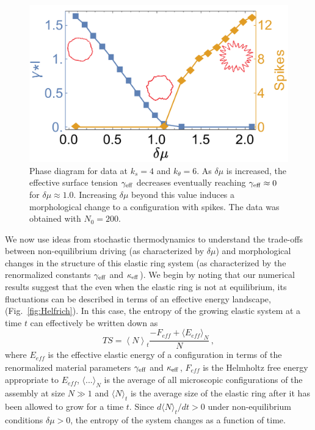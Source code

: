\documentclass[amsmath,preprintnumbers,10pt,nofootinbib,prl,twocolumn]{revtex4-1}
\begin{document}

\begin{figure}[tbb]
\centering
\includegraphics[scale=0.25]{lobefork4ktheta6new2Fig4.pdf}
\caption{Phase diagram for data at $k_s=4$ and $k_\theta = 6$. As $\delta\mu$ is increased, the effective surface tension $\gamma_{\rm eff}$ decreases eventually reaching $\gamma_{\rm eff}\approx 0$ for $\delta\mu \approx 1.0$.  Increasing $\delta \mu$ beyond this value induces a morphological change to a configuration with spikes. The data was obtained with $N_0=200$.} \label{fig:HelfrichInstability}
\end{figure}

We now use ideas from stochastic thermodynamics to understand the trade-offs between non-equilibrium driving (as characterized by $\delta \mu$) and morphological changes in the structure of this elastic ring system (as characterized by the renormalized constants $\gamma_{\rm eff}$ and $\kappa_{\rm eff}$). We begin by noting that our numerical results suggest that the even when the elastic ring is not at equilibrium, its fluctuations can be described in terms of an effective energy landscape, (Fig.~\ref{fig:Helfrich}). In this case, the entropy of the growing elastic system at a time $t$ can effectively be written down as~\cite{Nguyen2016,Esposito2012}
\begin{equation}
\label{eq:entropysystem}
 TS=\left\langle N \right\rangle_t \frac{-F_{\mathit{eff}} + \langle E_{\mathit{eff}} \rangle _N}{N}\,,
\end{equation}
where $E_{\mathit{eff}}$ is the effective elastic energy of a configuration in terms of the renormalized material parameters $\gamma_{\rm eff}$ and $\kappa_{\rm eff}$, $F_{\mathit{eff}}$ is the Helmholtz free energy appropriate to $E_{\mathit{eff}}$, $\langle...\rangle_N$ is the average of all microscopic configurations of the assembly at size $N\gg 1$ and $\langle N \rangle_t$ is the average size of the elastic ring after it has been allowed to grow for a time $t$. Since $d\langle N \rangle_t/dt > 0$ under non-equilibrium conditions $\delta\mu >0$, the entropy of the system changes as a function of time. 
\end{document}
